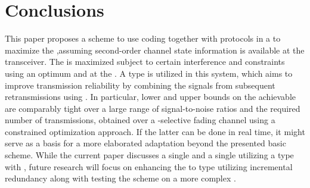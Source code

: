 \section{Conclusions}
\label{sec:5}
This paper proposes a \myCLO{} scheme to use \myLDPC{} coding together with \myCC{} protocols in a \myUCRS{} to maximize the \mySU{} \mySE{},assuming second-order channel state information is available at the \mySU{} transceiver. The \mySE{} is maximized subject to certain
interference and \myQoS{} constraints using an optimum \myJBPL{} and \myCA{} at the \mySU{} \myTX{}. A \myTHARQ{} type \myII{} is utilized in this system, which aims to improve \mySU{} transmission reliability by combining the signals from subsequent retransmissions using \myEGC{}. In particular, lower and upper bounds on the achievable \mySE{} are comparably tight over a large range of signal-to-noise ratios and the required number of transmissions, obtained over a \myTF{}-selective
fading channel using a constrained optimization approach. If the latter can be done in real time, it might serve as a basis for a more elaborated adaptation beyond the presented basic scheme.
While the current paper discusses a single \mySU{} and a single \myPU{} \myUCRS{} utilizing a \myTHARQ{} type \myII{} with \myCC{}, future research will focus on enhancing the \myTHARQ{} to type \myIII{} utilizing incremental redundancy along with testing the \myCLO{} scheme on a more complex \myUCRS{}.
